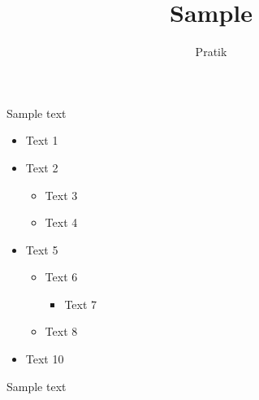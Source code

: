 \documentclass[12pt]{article}
\begin{document}
\title{Sample}
\author{Pratik}\maketitle

Sample text

\begin{itemize}
\item Text 1
\item Text 2
\begin{itemize}
\item Text 3
\item Text 4
\end{itemize}
\item Text 5
\begin{itemize}
\item Text 6
\begin{itemize}
\item Text 7
\end{itemize}
\item Text 8
\end{itemize}
\item Text 10
\end{itemize}

Sample text
\end{document}

